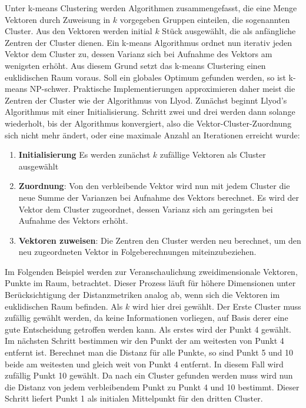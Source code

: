 Unter k-means Clustering werden Algorithmen zusammengefasst, die eine Menge Vektoren durch Zuweisung in $k$ vorgegeben Gruppen einteilen, die sogenannten Cluster. Aus den Vektoren werden initial $k$ Stück ausgewählt, die als anfängliche Zentren der Cluster dienen. Ein k-means Algorithmus ordnet nun iterativ jeden Vektor dem Cluster zu, dessen Varianz sich bei Aufnahme des Vektors am wenigsten erhöht. Aus diesem Grund setzt das k-means Clustering einen euklidischen Raum voraus.
Soll ein globales Optimum gefunden werden, so ist k-means NP-schwer. Praktische Implementierungen approximieren daher meist die Zentren der Cluster wie der Algorithmus von Llyod. Zunächst beginnt Llyod's Algorithmus mit einer Initialisierung. Schritt zwei und drei werden dann solange wiederholt, bis der Algorithmus konvergiert, also die Vektor-Cluster-Zuordnung sich nicht mehr ändert, oder eine maximale Anzahl an Iterationen erreicht wurde: 

\begin{enumerate}
	\item \textbf{Initialisierung} Es werden zunächst $k$ zufällige Vektoren als Cluster ausgewählt
	\item \textbf{Zuordnung}: Von den verbleibende Vektor wird nun mit jedem Cluster die neue Summe der Varianzen bei Aufnahme des Vektors berechnet. Es wird der Vektor dem Cluster zugeordnet, dessen Varianz sich am geringsten bei Aufnahme des Vektors erhöht.
	\item \textbf{Vektoren zuweisen}: Die Zentren den Cluster werden neu berechnet, um den neu zugeordneten Vektor in Folgeberechnungen miteinzubeziehen.
\end{enumerate}

Im Folgenden Beispiel werden zur Veranschaulichung zweidimensionale Vektoren, Punkte im Raum, betrachtet. Dieser Prozess läuft für höhere Dimensionen unter Berücksichtigung der Distanzmetriken analog ab, wenn sich die Vektoren im euklidischen Raum befinden. Als $k$ wird hier drei gewählt. Der Erste Cluster muss zufällig gewählt werden, da keine Informationen vorliegen, auf Basis derer eine gute Entscheidung getroffen werden kann. Als erstes wird der Punkt 4 gewählt. Im nächsten Schritt bestimmen wir den Punkt der am weitesten von Punkt 4 entfernt ist. Berechnet man die Distanz für alle Punkte, so sind Punkt 5 und 10 beide am weitesten und gleich weit von Punkt 4 entfernt. In diesem Fall wird zufällig Punkt 10 gewählt. Da nach ein Cluster gefunden werden muss wird nun die Distanz von jedem verbleibendem Punkt zu Punkt 4 und 10 bestimmt. Dieser Schritt liefert Punkt 1 als initialen Mittelpunkt für den dritten Cluster. \cite{mmd2011}

